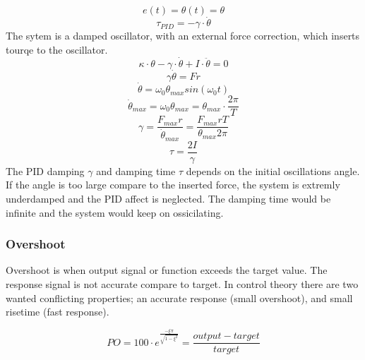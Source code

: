 \documentclass[\main/master.tex]{subfiles}
\begin{document}
\begin{equation}
e(t) = \theta(t) = \theta   \label{eqn:error}
\end{equation}
\begin{equation}
\tau_{PID} = -\gamma\cdot\dot{\theta}   \label{eqn:friction_tourqe}
\end{equation}
The sytem is a damped oscillator, with an external force correction, which inserts tourqe to the oscillator.
\begin{equation}
\kappa\cdot\theta - \gamma\cdot\dot{\theta}  + I\cdot\ddot{\theta} = 0   \label{eqn:damped__pid_motion_equation}
\end{equation}
\begin{equation}
\gamma\dot{\theta}  = Fr   \label{eqn:damped__pid_motion_equation}
\end{equation}
\begin{equation}
\dot{\theta} = \omega_0\theta_{max}sin(\omega_0 t )    \label{eqn:undamped_motion_equation}
\end{equation}
\begin{equation}
\dot{\theta}_{max} = \omega_0\theta_{max} = \theta_{max}\cdot\frac{2\pi}{T}    \label{eqn:undamped_motion_equation}
\end{equation}
\begin{equation}
\gamma  = \frac{F_{max}r}{\dot{\theta}_{max}} =\frac{F_{max}rT}{\theta_{max}2\pi}    \label{eqn:damped_pid_motion_equation}
\end{equation}
\begin{equation}
\tau =  \frac{2I}{\gamma}  \label{eqn:damping_time}
\end{equation}
The PID damping $\gamma$ and damping time $\tau$ depends on the initial oscillations angle. If the angle is too large compare to the inserted force, the system is extremly underdamped and the PID affect is neglected. The damping time would be infinite and the system would keep on ossicilating.


\newpage
\subsubsection{Overshoot}
Overshoot is when output signal or function exceeds the target value. The response signal is not accurate compare to target. In control theory there are two wanted conflicting properties; an accurate response (small overshoot), and small risetime (fast response). 

\begin{equation}
PO = 100\cdot e ^{\frac{-\xi\pi}{\sqrt{1-\xi^2}}} = \frac{output-target}{target}   \label{eqn:percentage_overshoot}
\end{equation}
\end{document}
